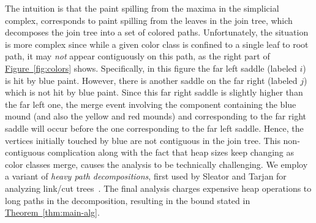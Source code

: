 \documentclass[11pt]{article}
\theoremstyle{definition}
\newcommand{\Fig}[1]{\hyperref[fig:#1]{Figure~\ref*{fig:#1}}} %
\newcommand{\Thm}[1]{\hyperref[thm:#1]{Theorem~\ref*{thm:#1}}} %
\begin{document}
The intuition is that the paint spilling from the maxima in the simplicial complex, corresponds to paint spilling from the leaves in 
the join tree, which decomposes the join tree into a set of colored paths.  Unfortunately, the situation is more complex since 
while a given color class is confined to a single leaf to root path, it may \emph{not} appear contiguously on this path, as the right part of \Fig{colors} shows. 
Specifically, in this figure the far left saddle (labeled $i$) is hit by blue paint.  However, there is another 
saddle on the far right (labeled $j$) which is not hit by blue paint.  Since this far right saddle is slightly 
higher than the far left one, the merge event involving the component containing the blue mound (and also the yellow and red mounds) and corresponding to the far right saddle
will occur before the one corresponding to the far left saddle.  Hence, the vertices initially touched by blue are not contiguous in the join tree.
%
This non-contiguous complication along with the fact that heap sizes keep changing as color classes merge, causes the analysis to be technically challenging. 
We employ a variant of \emph{heavy path decompositions}, first used by Sleator and Tarjan for analyzing link/cut trees~\cite{st-dsdt-83}.
The final analysis charges expensive heap operations to long paths in the decomposition, resulting in the bound stated in \Thm{main-alg}.
 
 

\end{document}
